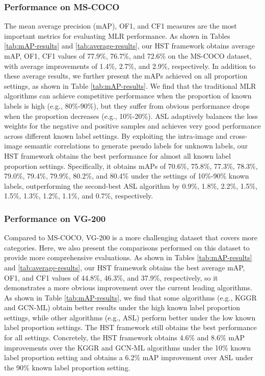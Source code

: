 \subsubsection{Performance on MS-COCO}
The mean average precision (mAP), OF1, and CF1 measures are the most important metrics for evaluating MLR performance. As shown in Tables \ref{tab:mAP-results} and \ref{tab:average-results}, our HST framework obtains average mAP, OF1, CF1 values of 77.9\%, 76.7\%, and 72.6\% on the MS-COCO dataset, with average improvements of 1.4\%, 2.7\%, and 2.9\%, respectively. In addition to these average results, we further present the mAPs achieved on all proportion settings, as shown in Table \ref{tab:mAP-results}. We find that the traditional MLR algorithms can achieve competitive performance when the proportion of known labels is high (e.g., 80\%-90\%), but they suffer from obvious performance drops when the proportion decreases (e.g., 10\%-20\%). ASL adaptively balances the loss weights for the negative and positive samples and achieves very good performance across different known label settings. By exploiting the intra-image and cross-image semantic correlations to generate pseudo labels for unknown labels, our HST framework obtains the best performance for almost all known label proportion settings. Specifically, it obtains mAPs of 70.6\%, 75.8\%, 77.3\%, 78.3\%, 79.0\%, 79.4\%, 79.9\%, 80.2\%, and 80.4\% under the settings of 10\%-90\% known labels, outperforming the second-best ASL algorithm by 0.9\%, 1.8\%, 2.2\%, 1.5\%, 1.5\%, 1.3\%, 1.2\%, 1.1\%, and 0.7\%, respectively.

\subsubsection{Performance on VG-200}
Compared to MS-COCO, VG-200 is a more challenging dataset that covers more categories. Here, we also present the comparisons performed on this dataset to provide more comprehensive evaluations. As shown in Tables \ref{tab:mAP-results} and \ref{tab:average-results}, our HST framework obtains the best average mAP, OF1, and CF1 values of 44.8\%, 46.3\%, and 37.9\%, respectively, so it demonstrates a more obvious improvement over the current leading algorithms. As shown in Table \ref{tab:mAP-results}, we find that some algorithms (e.g., KGGR and GCN-ML) obtain better results under the high known label proportion settings, while other algorithms (e.g., ASL) perform better under the low known label proportion settings. The HST framework still obtains the best performance for all settings. Concretely, the HST framework obtains 4.6\% and 8.6\% mAP improvements over the KGGR and GCN-ML algorithms under the 10\% known label proportion setting and obtains a 6.2\% mAP improvement over ASL under the 90\% known label proportion setting.




